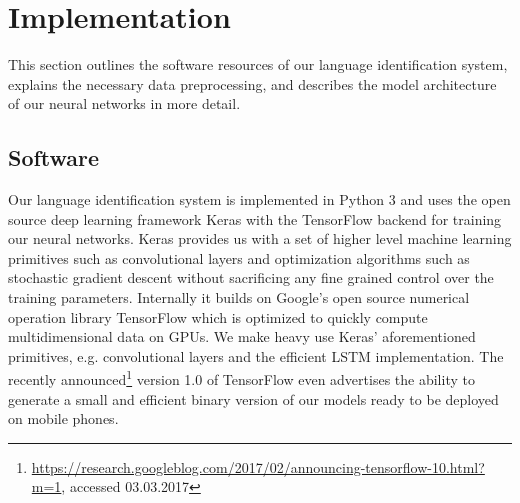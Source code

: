 \section{Implementation}
This section outlines the software resources of our language identification system, explains the necessary data preprocessing, and describes the model architecture of our neural networks in more detail.

\subsection{Software}
\label{sec:software}

	Our language identification system is implemented in Python 3 and uses the open source deep learning framework Keras\cite{chollet2015keras} with the TensorFlow\cite{abadi2016tensorflow} backend for training our neural networks. Keras provides us with a set of higher level machine learning primitives such as convolutional layers and optimization algorithms such as stochastic gradient descent without sacrificing any fine grained control over the training parameters. Internally it builds on Google's open source numerical operation library TensorFlow which is optimized to quickly compute multidimensional data on GPUs. We make heavy use Keras' aforementioned primitives, e.g. convolutional layers and the efficient LSTM implementation. The recently announced\footnote{\url{https://research.googleblog.com/2017/02/announcing-tensorflow-10.html?m=1}, accessed 03.03.2017} version 1.0 of TensorFlow even advertises the ability to generate a small and efficient binary version of our models ready to be deployed on mobile phones.
	
